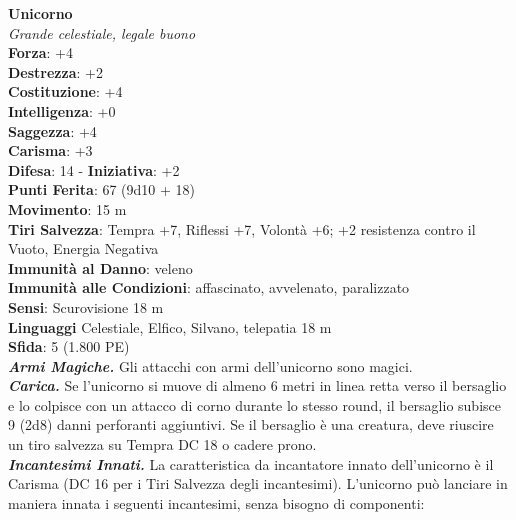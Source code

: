 \begin{multicols}{2}
\medskip\textbf{Unicorno}\\
\emph{Grande celestiale, legale buono}\\
\textbf{Forza}: +4\\
\textbf{Destrezza}: +2\\
\textbf{Costituzione}: +4\\
\textbf{Intelligenza}: +0\\
\textbf{Saggezza}: +4\\
\textbf{Carisma}: +3\\
\textbf{Difesa}: 14 - \textbf{Iniziativa}: +2\\
\textbf{Punti Ferita}: 67 (9d10 + 18)\\
\textbf{Movimento}: 15 m\\
\textbf{Tiri Salvezza}: Tempra +7, Riflessi +7, Volontà +6; +2 resistenza contro il Vuoto, Energia Negativa\\
\textbf{Immunità al Danno}: veleno\\
\textbf{Immunità alle Condizioni}: affascinato, avvelenato, paralizzato\\
\textbf{Sensi}: Scurovisione 18 m\\
\textbf{Linguaggi} Celestiale, Elfico, Silvano, telepatia 18 m\\
\textbf{Sfida}: 5 (1.800 PE)\smallskip\\
\emph{\textbf{Armi Magiche.}} Gli attacchi con armi dell'unicorno sono magici.\\
\emph{\textbf{Carica.}} Se l'unicorno si muove di almeno 6 metri in linea retta verso il bersaglio e lo colpisce con un attacco di corno durante lo stesso round, il bersaglio subisce 9 (2d8) danni perforanti aggiuntivi. Se il bersaglio è una creatura, deve riuscire un tiro salvezza su Tempra DC  18 o cadere prono.\\

\emph{\textbf{Incantesimi Innati.}} La caratteristica da incantatore innato dell'unicorno è il Carisma (DC  16 per i Tiri Salvezza degli incantesimi). L'unicorno può lanciare in maniera innata i seguenti incantesimi, senza bisogno di componenti:\\


\end{multicols}
